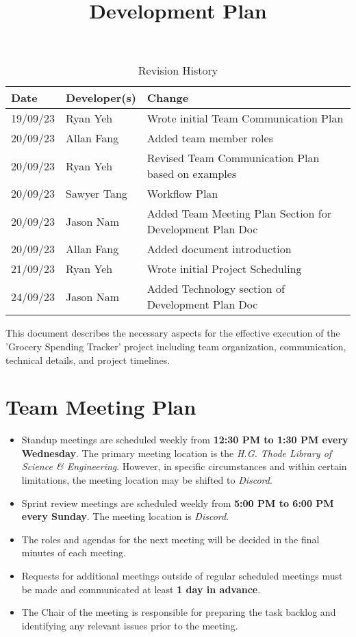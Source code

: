 \documentclass{article}
\title{Development Plan\\\progname}
\author{\authname}
\date{}
\begin{document}
\maketitle

\begin{table}[hp]
\caption{Revision History} \label{TblRevisionHistory}
\begin{tabularx}{\textwidth}{llX}
\toprule
\textbf{Date} & \textbf{Developer(s)} & \textbf{Change}\\
\midrule
19/09/23 & Ryan Yeh & Wrote initial Team Communication Plan\\
20/09/23 & Allan Fang & Added team member roles\\
20/09/23 & Ryan Yeh & Revised Team Communication Plan based on examples\\
20/09/23 & Sawyer Tang & Workflow Plan\\
20/09/23 & Jason Nam & Added Team Meeting Plan Section for Development Plan Doc\\
20/09/23 & Allan Fang & Added document introduction\\
21/09/23 & Ryan Yeh & Wrote initial Project Scheduling\\
24/09/23 & Jason Nam & Added Technology section of Development Plan Doc\\
\bottomrule
\end{tabularx}
\end{table}

This document describes the necessary aspects for the effective execution of the 'Grocery Spending Tracker' project including team organization, communication, technical details, and project timelines.

\section{Team Meeting Plan}

\begin{itemize}
	\item Standup meetings are scheduled weekly from \textbf{12:30 PM to 1:30 PM every Wednesday}. The primary meeting location is the \emph{H.G. Thode Library of Science \& Engineering}. However, in specific circumstances and within certain limitations, the meeting location may be shifted to \emph{Discord}.
    	\item Sprint review meetings are scheduled weekly from \textbf{5:00 PM to 6:00 PM every Sunday}. The meeting location is \emph{Discord}.
    	\item The roles and agendas for the next meeting will be decided in the final minutes of each meeting.
    	\item Requests for additional meetings outside of regular scheduled meetings must be made and communicated at least \textbf{1 day in advance}.
   	\item The Chair of the meeting is responsible for preparing the task backlog and identifying any relevant issues prior to the meeting.
\end{itemize}
\end{document}
